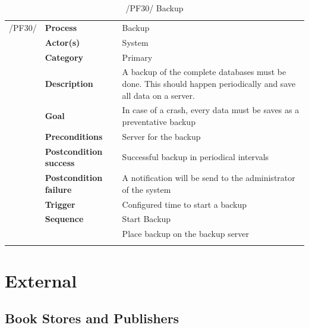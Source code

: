 \documentclass[11pt,a4paper,oneside,svgnames]{report}
\begin{document}
\begin{table}[H]
\centering
\begin{tabular}{p{1.5cm}p{3cm}p{8cm}}
\cellcolor{white}/PF30/	& \textbf{Process} & Backup\\
\cellcolor{white}		& \textbf{Actor(s)} & System\\
\cellcolor{white}		& \textbf{Category} & Primary\\
\cellcolor{white}		& \textbf{Description}	 & A backup of the complete databases must be done. This should happen periodically and save all data on a server.\\
\cellcolor{white}		& \textbf{Goal} & In case of a crash, every data must be saves as a preventative backup\\
\cellcolor{white}		& \textbf{Preconditions} & Server for the backup\\
\cellcolor{white}		& \textbf{Postcondition success} & Successful backup in periodical intervals\\
\cellcolor{white}		& \textbf{Postcondition failure} & A notification will be send to the administrator of the system\\
\cellcolor{white}		& \textbf{Trigger} & Configured time to start a backup\\
\cellcolor{white}		& \textbf{Sequence} & Start Backup\\
\cellcolor{white}		& & Place backup on the backup server\\
\cellcolor{white}\hfill \\
\end{tabular}
\caption{/PF30/ Backup}
\label{tab:pf30}
\end{table}


\section{External}

\subsection{Book Stores and Publishers}
\end{document}
